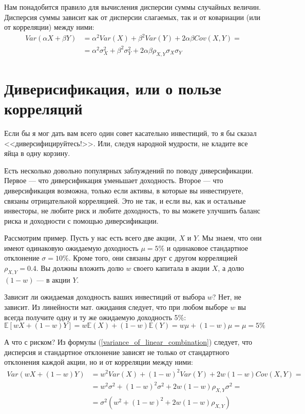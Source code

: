 Нам понадобится правило для вычисления дисперсии суммы случайных величин. Дисперсия суммы зависит как от дисперсии слагаемых, так и от ковариации (или от корреляции) между ними:
\begin{align}
Var(\alpha X + \beta Y) &= \alpha^2 Var(X) + \beta^2 Var(Y) + 2 \alpha \beta Cov(X, Y) = \nonumber \\
&= \alpha^2\sigma_X^2 + \beta^2 \sigma_Y^2 + 2\alpha\beta\rho_{X,Y}\sigma_X\sigma_Y
\label{variance_of_linear_combination}
\end{align}

\section*{Диверисификация, или о пользе корреляций}

Если бы я мог дать вам всего один совет касательно инвестиций, то я бы сказал <<диверсифицируйтесь!>>. Или, следуя народной мудрости, не кладите все яйца в одну корзину. 

Есть несколько довольно популярных заблуждений по поводу диверсификации. Первое --- что диверсификация уменьшает доходность. Второе --- что диверсификация возможна, только если активы, в которые вы инвестируете, связаны отрицательной корреляцией. Это не так, и если вы, как и остальные инвесторы, не любите риск и любите доходность, то вы можете улучшить баланс риска и доходности с помощью диверсификации.

Рассмотрим пример. Пусть у нас есть всего две акции, $X$ и $Y$. Мы знаем, что они имеют одинаковую ожидаемую доходность $\mu=5\%$ и одинаковое стандартное отклонение $\sigma=10\%$. Кроме того, они связаны друг с другом корреляцией  $\rho_{X,Y} = 0.4$. Вы должны вложить долю $w$ своего капитала в акции $X$, а долю $(1-w)$ --- в акции $Y$.

Зависит ли ожидаемая доходность ваших инвестиций от выбора $w$? Нет, не зависит. Из линейности мат. ожидания следует, что при любом выборе $w$ вы всегда получите одну и ту же ожидаемую доходность 5\%:
\begin{equation*}
\mathbb{E}\left[ wX + (1-w)Y\right] = w\mathbb{E}(X) + (1-w)\mathbb{E}(Y) = w\mu + (1-w)\mu = \mu = 5\%
\end{equation*}

А что с риском? Из формулы (\ref{variance_of_linear_combination}) следует, что дисперсия и стандартное отклонение зависят не только от стандартного отклонения каждой акции, но и от корреляции между ними:
\begin{align*}
Var(wX + (1-w)Y)
&= w^2Var(X) + (1-w)^2Var(Y) + 2w(1-w)Cov(X,Y) = \\
&= w^2\sigma^2 + (1-w)^2\sigma^2 + 2w(1-w)\rho_{X,Y}\sigma^2 = \\
&= \sigma^2\left(w^2 + (1-w)^2 + 2w(1-w)\rho_{X,Y} \right)
\end{align*}

